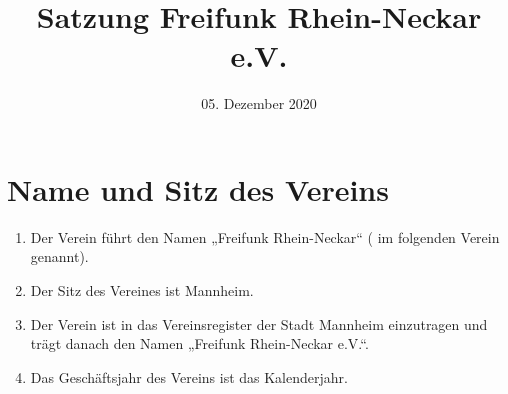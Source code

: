\documentclass[12pt,a4paper,titlepage]{scrartcl}
\date{05. Dezember 2020}
\title{Satzung Freifunk Rhein-Neckar e.V.}
\begin{document}
\maketitle
{}
\thispagestyle{empty}
\newpage
{}
\setcounter{page}{1}

\section{Name und Sitz des Vereins}
\begin{enumerate}
\item Der Verein führt den Namen „Freifunk Rhein-Neckar“ ( im folgenden Verein genannt).
\item Der Sitz des Vereines ist Mannheim.
\item Der Verein ist in das Vereinsregister der Stadt Mannheim einzutragen und trägt 
danach den Namen „Freifunk Rhein-Neckar e.V.“.
\item Das Geschäftsjahr des Vereins ist das Kalenderjahr. 
\end{enumerate}
\end{document}
